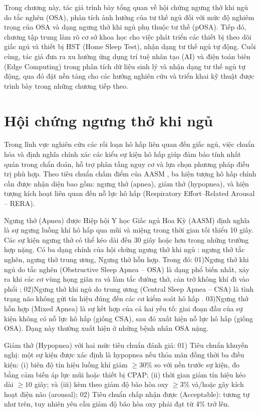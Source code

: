 
Trong chương này, tác giả trình bày tổng quan về hội chứng ngưng thở khi ngủ do
tắc nghẽn (OSA), phân tích ảnh hưởng của tư thế ngủ đối với mức độ nghiêm trọng
của OSA và dạng ngưng thở khi ngủ phụ thuộc tư thế (pOSA). Tiếp đó, chương tập
trung làm rõ cơ sở khoa học cho việc phát triển các thiết bị theo dõi giấc ngủ
và thiết bị HST (Home Sleep Test), nhận dạng tư thế ngủ tự động. Cuối cùng, tác
giả đưa ra xu hướng ứng dụng trí tuệ nhân tạo (AI) và điện toán biên (Edge
Computing) trong phân tích dữ liệu sinh lý và nhận dạng tư thế ngủ tự động, qua
đó đặt nền tảng cho các hướng nghiên cứu và triển khai kỹ thuật được trình bày
trong những chương tiếp theo.
\section{Hội chứng ngưng thở khi ngủ}

Trong lĩnh vực nghiên cứu các rối loạn hô hấp liên quan đến giấc ngủ, việc
chuẩn hóa và định nghĩa chính xác các kiểu sự kiện hô hấp giúp đảm bảo tính
nhất quán trong chẩn đoán, hỗ trợ phân tầng nguy cơ và lựa chọn phương pháp
điều trị phù hợp. Theo tiêu chuẩn chấm điểm của AASM \cite{berry2012scoring},
ba hiện tượng hô hấp chính cần được nhận diện bao gồm: ngưng thở (apnea), giảm
thở (hypopnea), và hiện tượng kích hoạt liên quan đến nỗ lực hô hấp
(Respiratory Effort–Related Arousal – RERA).

Ngưng thở (Apnea) được Hiệp hội Y học Giấc ngủ Hoa Kỳ (AASM) định nghĩa là sự
ngưng luồng khí hô hấp qua mũi và miệng trong thời gian tối thiểu 10 giây. Các
sự kiện ngưng thở có thể kéo dài đến 30 giây hoặc hơn trong những trường hợp
nặng. Có ba dạng chính của hội chứng ngưng thở khi ngủ \cite{ThaySYOSA}: ngưng
thở tắc nghẽn, ngưng thở trung ương, Ngưng thở hỗn hợp. Trong đó: 01)Ngưng thở
khi ngủ do tắc nghẽn (Obstructive Sleep Apnea – OSA) là dạng phổ biến nhất, xảy
ra khi các cơ vùng họng giãn ra và làm tắc đường thở, cản trở không khí đi vào
phổi \cite{osa_summary}; 02)Ngưng thở khi ngủ do trung ương (Central Sleep
Apnea – CSA) là tình trạng não không gửi tín hiệu đúng đến các cơ kiểm soát hô
hấp \cite{eckert2007csa}. 03)Ngưng thở hỗn hợp (Mixed Apnea) là sự kết hợp của
cả hai yếu tố: giai đoạn đầu của sự kiện không có nỗ lực hô hấp (giống CSA),
sau đó xuất hiện nỗ lực hô hấp (giống OSA). Dạng này thường xuất hiện ở những
bệnh nhân OSA nặng.

Giảm thở (Hypopnea) với hai mức tiêu chuẩn đánh giá: 01) Tiêu chuẩn khuyến
nghị: một sự kiện được xác định là hypopnea nếu thỏa mãn đồng thời ba điều
kiện: (i) biên độ tín hiệu luồng khí giảm $\geq 30$\% so với nền trước sự kiện,
đo bằng cảm biến áp lực mũi hoặc thiết bị CPAP; (ii) thời gian giảm tín hiệu
kéo dài $\geq 10$ giây; và (iii) kèm theo giảm độ bão hòa oxy $\geq 3$\%
và/hoặc gây kích hoạt điện não (arousal); 02) Tiêu chuẩn chấp nhận được
(Acceptable): tương tự như trên, tuy nhiên yêu cầu giảm độ bão hòa oxy phải đạt
từ 4\% trở lên.

